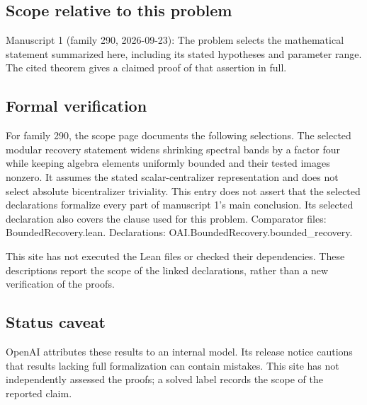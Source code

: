 \documentclass[11pt]{article}
\begin{document}
\subsection{Scope relative to this problem}
Manuscript 1 (family 290, 2026-09-23): The problem selects the mathematical statement summarized here, including its stated hypotheses and parameter range. The cited theorem gives a claimed proof of that assertion in full.

\subsection{Formal verification}
For family 290, the scope page documents the following selections. The selected modular recovery statement widens shrinking spectral bands by a factor four while keeping algebra elements uniformly bounded and their tested images nonzero. It assumes the stated scalar-centralizer representation and does not select absolute bicentralizer triviality. This entry does not assert that the selected declarations formalize every part of manuscript 1's main conclusion. Its selected declaration also covers the clause used for this problem. Comparator files: BoundedRecovery.lean. Declarations: OAI.BoundedRecovery.bounded\_recovery.

This site has not executed the Lean files or checked their dependencies. These descriptions report the scope of the linked declarations, rather than a new verification of the proofs.

\subsection{Status caveat}
OpenAI attributes these results to an internal model. Its release notice cautions that results lacking full formalization can contain mistakes. This site has not independently assessed the proofs; a solved label records the scope of the reported claim.
\end{document}
